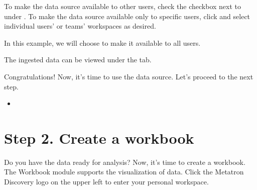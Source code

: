 \documentclass[letterpaper,10pt,english]{sphinxmanual}
\begin{document}
To make the data source available to other users, check the checkbox next to  under . To make the data source available only to specific users, click  and select individual users’ or teams’ workspaces as desired.
\begin{quote}

\begin{figure}[H]
\centering

\noindent{}
\end{figure}
\end{quote}

In this example, we will choose  to make it available to all users.
\begin{quote}

\begin{figure}[H]
\centering

\noindent{}
\end{figure}
\end{quote}

The ingested data can be viewed under the  tab.
\begin{quote}

\begin{figure}[H]
\centering

\noindent{}
\end{figure}
\end{quote}

Congratulations! Now, it’s time to use the data source. Let’s proceed to the next step.
\begin{itemize}
\item {} 
{\hyperref[\detokenize{discovery/part00/step2::doc}]{}}

\end{itemize}


\section{Step 2. Create a workbook}
\label{\detokenize{discovery/part00/step2:step2}}\label{\detokenize{discovery/part00/step2::doc}}
Do you have the data ready for analysis? Now, it’s time to create a workbook. The Workbook module supports the visualization of data. Click the Metatron Discovery logo on the upper left to enter your personal workspace.
\begin{quote}

\begin{figure}[H]
\centering

\noindent{}
\end{figure}
\end{quote}
\end{document}
